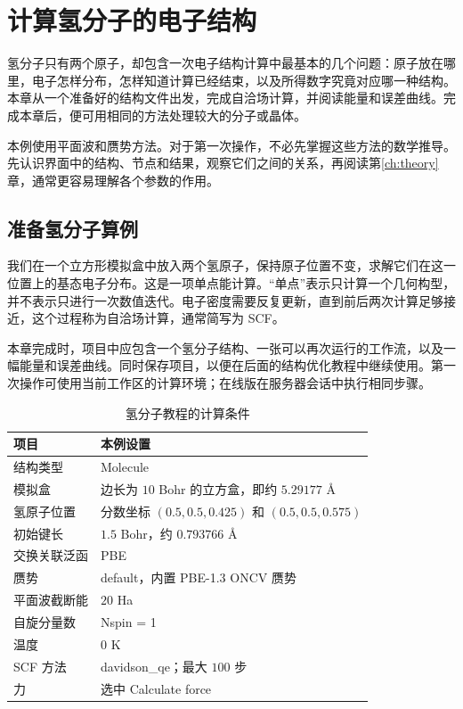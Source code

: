 \chapter{计算氢分子的电子结构}\label{ch:first}

氢分子只有两个原子，却包含一次电子结构计算中最基本的几个问题：原子放在哪里，电子怎样分布，怎样知道计算已经结束，以及所得数字究竟对应哪一种结构。本章从一个准备好的结构文件出发，完成自洽场计算，并阅读能量和误差曲线。完成本章后，便可用相同的方法处理较大的分子或晶体。

本例使用平面波和赝势方法。对于第一次操作，不必先掌握这些方法的数学推导。先认识界面中的结构、节点和结果，观察它们之间的关系，再阅读第\ref{ch:theory}章，通常更容易理解各个参数的作用。

\section{准备氢分子算例}

我们在一个立方形模拟盒中放入两个氢原子，保持原子位置不变，求解它们在这一位置上的基态电子分布。这是一项单点能计算。“单点”表示只计算一个几何构型，并不表示只进行一次数值迭代。电子密度需要反复更新，直到前后两次计算足够接近，这个过程称为自洽场计算，通常简写为 SCF。

本章完成时，项目中应包含一个氢分子结构、一张可以再次运行的工作流，以及一幅能量和误差曲线。同时保存项目，以便在后面的结构优化教程中继续使用。第一次操作可使用当前工作区的计算环境；在线版在服务器会话中执行相同步骤。

\begin{table}[htbp]
\centering
\caption{氢分子教程的计算条件}
\begin{tabularx}{\linewidth}{lX}
\toprule
项目 & 本例设置\\
\midrule
结构类型 & Molecule\\
模拟盒 & 边长为 $10$ Bohr 的立方盒，即约 $5.29177$ Å\\
氢原子位置 & 分数坐标 $(0.5,0.5,0.425)$ 和 $(0.5,0.5,0.575)$\\
初始键长 & $1.5$ Bohr，约 $0.793766$ Å\\
交换关联泛函 & PBE\\
赝势 & default，内置 PBE-1.3 ONCV 赝势\\
平面波截断能 & $20$ Ha\\
自旋分量数 & Nspin = 1\\
温度 & $0$ K\\
SCF 方法 & davidson\_qe；最大 $100$ 步\\
力 & 选中 Calculate force\\
\bottomrule
\end{tabularx}
\end{table}


